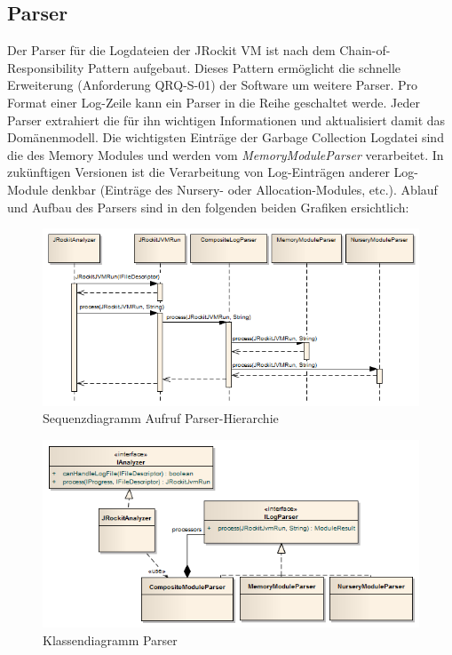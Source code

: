 \subsection{Parser}
Der Parser für die Logdateien der JRockit VM ist nach dem Chain-of-Responsibility Pattern\cite{wiki:chainOfResponsibilityPattern} aufgebaut. Dieses Pattern ermöglicht die schnelle Erweiterung (Anforderung QRQ-S-01) der Software um weitere Parser. Pro Format einer Log-Zeile kann ein Parser in die Reihe geschaltet werde. Jeder Parser extrahiert die für ihn wichtigen Informationen und aktualisiert damit das Domänenmodell. Die wichtigsten Einträge der Garbage Collection Logdatei sind die des Memory Modules und werden vom \textit{MemoryModuleParser} verarbeitet. In zukünftigen Versionen ist die Verarbeitung von Log-Einträgen anderer Log-Module denkbar (Einträge des Nursery- oder Allocation-Modules, etc.). Ablauf und Aufbau des Parsers sind in den folgenden beiden Grafiken ersichtlich:

 \begin{figure}[H]
  	\centering
    	\includegraphics[width=16cm]{images/acitivity_parse_prozess}
        	\caption{Sequenzdiagramm Aufruf Parser-Hierarchie}
\end{figure}
 \begin{figure}[H]
  	\centering
    	\includegraphics[width=16cm]{images/jrockit_log_processing}
        	\caption{Klassendiagramm Parser}
\end{figure}

